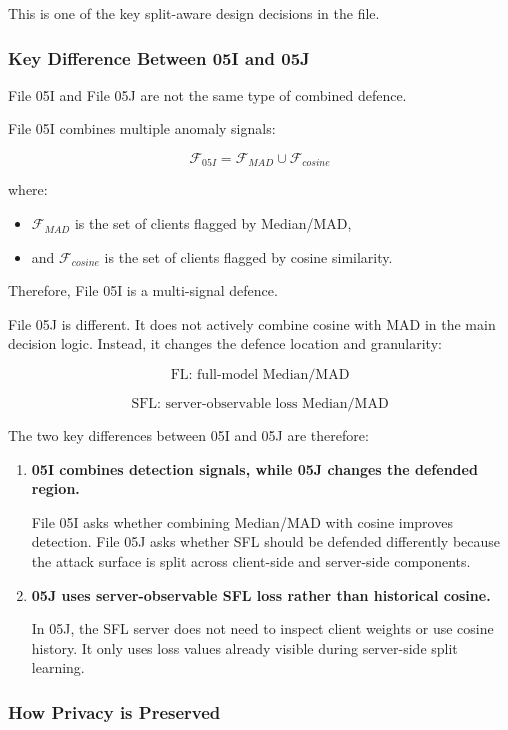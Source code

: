 This is one of the key split-aware design decisions in the file.

\subsubsection*{Key Difference Between 05I and 05J}

File 05I and File 05J are not the same type of combined defence.

File 05I combines multiple anomaly signals:

\[
\mathcal{F}_{05I}
=
\mathcal{F}_{MAD}
\cup
\mathcal{F}_{cosine}
\]

where:
\begin{itemize}
    \item $\mathcal{F}_{MAD}$ is the set of clients flagged by Median/MAD,
    \item and $\mathcal{F}_{cosine}$ is the set of clients flagged by cosine similarity.
\end{itemize}

Therefore, File 05I is a multi-signal defence.

File 05J is different. It does not actively combine cosine with MAD in the main decision logic. Instead, it changes the defence location and granularity:

\[
\text{FL: full-model Median/MAD}
\]

\[
\text{SFL: server-observable loss Median/MAD}
\]

The two key differences between 05I and 05J are therefore:

\begin{enumerate}
    \item \textbf{05I combines detection signals, while 05J changes the defended region.}

    File 05I asks whether combining Median/MAD with cosine improves detection. File 05J asks whether SFL should be defended differently because the attack surface is split across client-side and server-side components.

    \item \textbf{05J uses server-observable SFL loss rather than historical cosine.}

    In 05J, the SFL server does not need to inspect client weights or use cosine history. It only uses loss values already visible during server-side split learning.
\end{enumerate}

\subsubsection*{How Privacy is Preserved}

